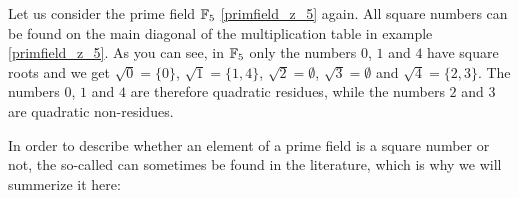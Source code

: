 \begin{example} 
\label{example:quadratic_residue_F5}
Let us consider the prime field $\mathbb{F}_5$ \ref{primfield_z_5} again. All square numbers can be found on the main diagonal of the multiplication table in example \ref{primfield_z_5}. As you can see, in $ \mathbb{F}_5 $ only the numbers $ 0 $, $ 1 $ and $ 4 $ have square roots and we get $ \sqrt{0} = \{0 \} $, $ \sqrt{1} = \{1,4 \} $, $ \sqrt{2} = \emptyset $, $ \sqrt{3} = \emptyset $ and $ \sqrt{4} = \{2,3 \} $. The numbers $0$, $1$ and $4$ are therefore quadratic residues, while the numbers $2$ and $3$ are quadratic non-residues.
\end{example}
In order to describe whether an element of a prime field is a square number  or not, the so-called  can sometimes be found in the literature, which is why we will summerize it here:

